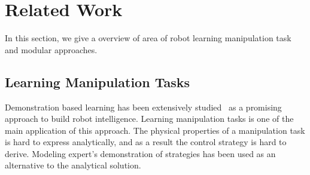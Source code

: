 \section{Related Work}
\label{sec:related}
In this section, we give a overview of area of robot learning manipulation task and modular approaches.



\subsection{Learning Manipulation Tasks}
Demonstration based learning has been extensively studied~\cite{calinon2007learning,dillmann2004teaching,kulic2012incremental} as a promising approach to build robot intelligence. %
Learning manipulation tasks is one of the main application of this approach. The physical properties of a manipulation task is hard to express analytically, and as a result the control strategy is hard to derive. Modeling expert's demonstration of strategies has been used as an alternative to the analytical solution.

